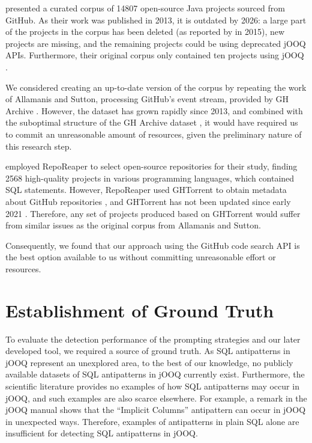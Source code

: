  presented a curated corpus of \num{14807} open-source Java projects sourced from GitHub. As their work was published in 2013, it is outdated by 2026: a large part of the projects in the corpus has been deleted (as reported by  in 2015), new projects are missing, and the remaining projects could be using deprecated jOOQ APIs. Furthermore, their original corpus only contained ten projects using jOOQ . 

We considered creating an up-to-date version of the corpus by repeating the work of Allamanis and Sutton, processing GitHub's event stream, provided by GH Archive . However, the dataset has grown rapidly since 2013, and combined with the suboptimal structure of the GH Archive dataset , it would have required us to commit an unreasonable amount of resources, given the preliminary nature of this research step. 

 employed RepoReaper  to select open-source repositories for their study, finding \num{2568} high-quality projects in various programming languages, which contained SQL statements. However, RepoReaper used GHTorrent  to obtain metadata about GitHub repositories , and GHTorrent has not been updated since early 2021 . Therefore, any set of projects produced based on GHTorrent would suffer from similar issues as the original corpus from Allamanis and Sutton.

Consequently, we found that our approach using the GitHub code search API is the best option available to us without committing unreasonable effort or resources.

\section{Establishment of Ground Truth}\label{sec:groundTruth}

To evaluate the detection performance of the prompting strategies and our later developed tool, we required a source of ground truth. As SQL antipatterns in jOOQ represent an unexplored area, to the best of our knowledge, no publicly available datasets of SQL antipatterns in jOOQ currently exist. Furthermore, the scientific literature provides no examples of how SQL antipatterns may occur in jOOQ, and such examples are also scarce elsewhere. For example, a remark in the jOOQ manual  shows that the “Implicit Columns” antipattern  can occur in jOOQ in unexpected ways. Therefore, examples of antipatterns in plain SQL alone are insufficient for detecting SQL antipatterns in jOOQ.

